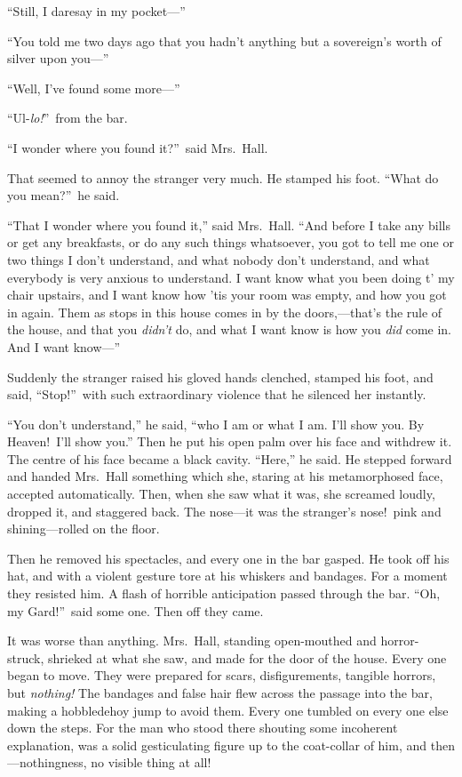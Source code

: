 “Still, I daresay in my pocket—”

“You told me two days ago that you hadn’t anything but a sovereign’s worth of silver upon you—”

“Well, I’ve found some more—”

“Ul-\emph{lo!}”\ from the bar.

“I wonder where you found it?”\ said Mrs.\ Hall.

That seemed to annoy the stranger very much. He stamped his foot. “What do you mean?”\ he said.

“That I wonder where you found it,” said Mrs.\ Hall. “And before I take any bills or get any breakfasts, or do any such things whatsoever, you got to tell me one or two things I don’t understand, and what nobody don’t understand, and what everybody is very anxious to understand. I want know what you been doing t’ my chair upstairs, and I want know how ’tis your room was empty, and how you got in again. Them as stops in this house comes in by the doors,—that’s the rule of the house, and that you \emph{didn’t} do, and what I want know is how you \emph{did} come in. And I want know—”

Suddenly the stranger raised his gloved hands clenched, stamped his foot, and said, “Stop!”\ with such extraordinary violence that he silenced her instantly.

“You don’t understand,” he said, “who I am or what I am. I’ll show you. By Heaven!\ I’ll show you.” Then he put his open palm over his face and withdrew it. The centre of his face became a black cavity. “Here,” he said. He stepped forward and handed Mrs.\ Hall something which she, staring at his metamorphosed face, accepted automatically. Then, when she saw what it was, she screamed loudly, dropped it, and staggered back. The nose—it was the stranger’s nose!\ pink and shining—rolled on the floor.

Then he removed his spectacles, and every one in the bar gasped. He took off his hat, and with a violent gesture tore at his whiskers and bandages. For a moment they resisted him. A flash of horrible anticipation passed through the bar. “Oh, my Gard!”\ said some one. Then off they came.

It was worse than anything. Mrs.\ Hall, standing open-mouthed and horror-struck, shrieked at what she saw, and made for the door of the house. Every one began to move. They were prepared for scars, disfigurements, tangible horrors, but \emph{nothing!} The bandages and false hair flew across the passage into the bar, making a hobbledehoy jump to avoid them. Every one tumbled on every one else down the steps. For the man who stood there shouting some incoherent explanation, was a solid gesticulating figure up to the coat-collar of him, and then—nothingness, no visible thing at all!


